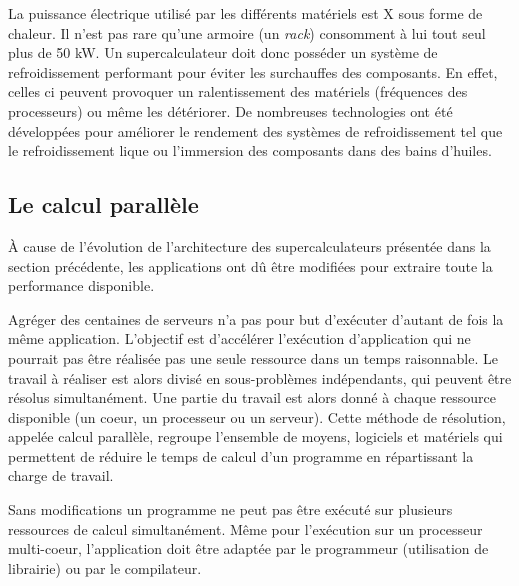         La puissance électrique utilisé par les différents matériels est X sous forme de chaleur. Il n'est pas rare qu'une armoire (un \textit{rack}) consomment à lui tout seul plus de 50 kW. 
        Un supercalculateur doit donc posséder un système de refroidissement performant pour éviter les surchauffes des composants. En effet, celles ci peuvent provoquer un ralentissement des matériels (fréquences des processeurs) ou même les détériorer. De nombreuses technologies ont été développées pour améliorer le rendement des systèmes de refroidissement tel que le refroidissement lique ou l'immersion des composants dans des bains d'huiles.
        




\subsection{Le calcul parallèle}\label{sec:prog_parallele}


        À cause de l'évolution de l'architecture des supercalculateurs présentée dans la section précédente, les applications ont dû être modifiées pour extraire toute la performance disponible. 
        
        Agréger des centaines de serveurs n'a pas pour but d'exécuter d'autant de fois la même application. L'objectif est d'accélérer l'exécution d'application qui ne pourrait pas être réalisée pas une seule ressource dans un temps raisonnable. Le travail à réaliser est alors divisé en sous-problèmes indépendants, qui peuvent être résolus simultanément. Une partie du travail est alors donné à chaque ressource disponible (un coeur, un processeur ou un serveur). Cette méthode de résolution, appelée calcul parallèle, regroupe l'ensemble de moyens, logiciels et matériels qui permettent de réduire le temps de calcul d'un programme en répartissant la charge de travail.
        
        Sans modifications un programme ne peut pas être exécuté sur plusieurs ressources de calcul simultanément. Même pour l'exécution sur un processeur multi-coeur, l'application doit être adaptée par le programmeur (utilisation de librairie) ou par le compilateur. 
        
